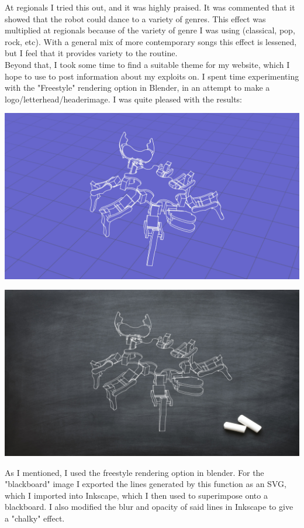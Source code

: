     		At regionals I tried this out, and it was highly praised. It was commented that it showed that the robot could dance to a variety of genres. This effect was multiplied at regionals because of the variety of genre I was using (classical, pop, rock, etc). With a general mix of more contemporary songs this effect is lessened, but I feel that it provides variety to the routine.\\
    		
    		Beyond that, I took some time to find a suitable theme for my website, which I hope to use to post information about my exploits on. I spent time experimenting with the "Freestyle" rendering option in Blender, in an attempt to make a logo/letterhead/headerimage. I was quite pleased with the results:\\
    		
    		\centerline{\includegraphics[width=0.75\linewidth]{images/blueprint_logo_4k}}
    		\vspace{10pt}
    		\centerline{\includegraphics[width=0.75\linewidth]{images/chalkboard_logo_4k}}
    		\vspace{10pt}
    		
    		As I mentioned, I used the freestyle rendering option in blender. For the "blackboard" image I exported the lines generated by this function as an SVG, which I imported into Inkscape, which I then used to superimpose onto a blackboard. I also modified the blur and opacity of said lines in Inkscape to give a "chalky" effect.\\